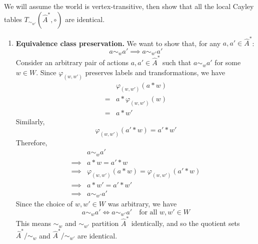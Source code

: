 \begin{proofE}
We will assume the world is vertex-transitive, then show that all the local Cayley tables $T_{\sim_{w'}}(\hat{A}^{*}, \circ)$ are identical.
\begin{enumerate}[(1)]
    \item \textbf{Equivalence class preservation.}
    We want to show that, for any $a, a' \in \hat{A}^{*}$:
    \begin{equation}
        a \sim_{w} a' \implies a \sim_{w'} a'
    \end{equation}
    Consider an arbitrary pair of actions $a, a' \in \hat{A}^{*}$ such that $a \sim_{w} a'$ for some $w \in W$.
    Since $\varphi_{(w,w')}$ preserves labels and transformations, we have
    \begin{align}
        & \varphi_{(w,w')}(a \ast w) \\
        = & a \ast \varphi_{(w,w')}(w) \\
        = & a \ast w'
    \end{align}
    Similarly,
    \begin{equation}
        \varphi_{(w,w')}(a' \ast w) = a' \ast w'
    \end{equation}
    Therefore,
    \begin{align}
        & a \sim_{w} a' \\
        \implies & a \ast w = a' \ast w \\
        \implies & \varphi_{(w,w')}(a \ast w) = \varphi_{(w,w')}(a' \ast w) \\
        \implies & a \ast w' = a' \ast w' \\
        \implies & a \sim_{w'} a'
    \end{align}
    Since the choice of $w, w' \in W$ was arbitrary, we have
    \begin{equation}
        a \sim_{w} a' \iff a \sim_{w'} a' \quad \text{for all $w, w' \in W$}
    \end{equation}
    This means $\sim_{w}$ and $\sim_{w'}$ partition $\hat{A}^{*}$ identically, and so the quotient sets $\hat{A}^{*}/\sim_{w}$ and $\hat{A}^{*}/\sim_{w'}$ are identical.


\end{enumerate}
\end{proofE}
